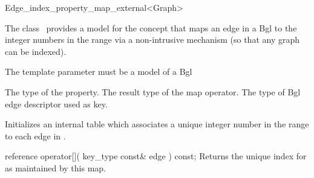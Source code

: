 

\begin{ccRefClass}{Edge_index_property_map_external<Graph>}


\ccDefinition

The class \ccRefName\ provides a model for the concept 
that maps an edge in a {\sc Bgl}
to the integer numbers in the range 
via a non-intrusive mechanism (so that any graph can be indexed).

The template parameter  must be a model of a {\sc Bgl}


\ccTypes
    {The type of the property.}
\ccGlue
    {The result type of the map operator.}
\ccGlue
\ccGlue
  {The type of {\sc Bgl} edge descriptor used as key.}

\ccCreation
{}  %

{Initializes an internal table which associates a unique integer
number in the range  to each edge in .}

\ccOperations

\ccMethod
  {reference operator[]( key_type const& edge ) const;}
  {Returns the unique index for  as maintained by this map.}
    
\ccIsModel
{} 


\end{ccRefClass}


